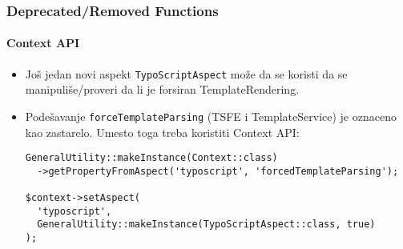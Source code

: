 
\begin{frame}[fragile]
	\frametitle{Deprecated/Removed Functions}
	\framesubtitle{Context API}

	\lstset{basicstyle=\tiny\ttfamily}

	\begin{itemize}

		\item Još jedan novi aspekt \texttt{TypoScriptAspect} može da se koristi da se manipuliše/proveri
			da li je forsiran TemplateRendering.

		\item Podešavanje \texttt{forceTemplateParsing} (TSFE i TemplateService) je oznaceno kao zastarelo.
			Umesto toga treba koristiti Context API:

\begin{lstlisting}
GeneralUtility::makeInstance(Context::class)
  ->getPropertyFromAspect('typoscript', 'forcedTemplateParsing');

$context->setAspect(
  'typoscript',
  GeneralUtility::makeInstance(TypoScriptAspect::class, true)
);
\end{lstlisting}

	\end{itemize}

\end{frame}


